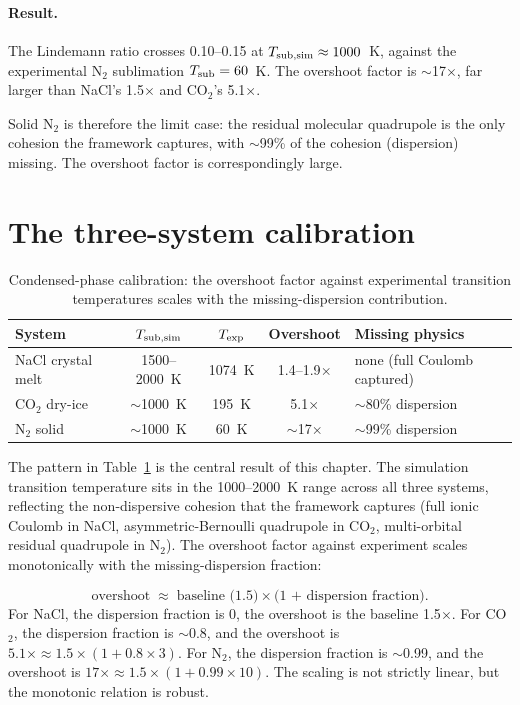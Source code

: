 \paragraph{Result.}
The Lindemann ratio crosses 0.10--0.15 at $T_{\rm sub,sim} \approx 1000$~K, against the experimental N$_2$ sublimation $T_{\rm sub} = 60$~K. The overshoot factor is $\sim$17$\times$, far larger than NaCl's 1.5$\times$ and CO$_2$'s 5.1$\times$.

Solid N$_2$ is therefore the limit case: the residual molecular quadrupole is the only cohesion the framework captures, with $\sim$99\% of the cohesion (dispersion) missing. The overshoot factor is correspondingly large.

\section{The three-system calibration}\label{sec:three-system}

\begin{table}[h]
\centering\small
\caption{Condensed-phase calibration: the overshoot factor against experimental transition temperatures scales with the missing-dispersion contribution.}\label{tab:condensed}
\begin{tabular}{l c c c l}
\toprule
System & $T_{\rm sub,sim}$ & $T_{\rm exp}$ & Overshoot & Missing physics \\
\midrule
NaCl crystal melt & 1500--2000~K & 1074~K & 1.4--1.9$\times$ & none (full Coulomb captured) \\
CO$_2$ dry-ice    & $\sim$1000~K & 195~K  & 5.1$\times$       & $\sim$80\% dispersion \\
N$_2$ solid       & $\sim$1000~K & 60~K   & $\sim$17$\times$  & $\sim$99\% dispersion \\
\bottomrule
\end{tabular}
\end{table}

The pattern in Table~\ref{tab:condensed} is the central result of this chapter. The simulation transition temperature sits in the 1000--2000~K range across all three systems, reflecting the non-dispersive cohesion that the framework captures (full ionic Coulomb in NaCl, asymmetric-Bernoulli quadrupole in CO$_2$, multi-orbital residual quadrupole in N$_2$). The overshoot factor against experiment scales monotonically with the missing-dispersion fraction:

\[
\text{overshoot} \;\approx\; \text{baseline (1.5)} \times \text{(1 + dispersion fraction)}.
\]
For NaCl, the dispersion fraction is 0, the overshoot is the baseline 1.5$\times$. For CO$_2$, the dispersion fraction is $\sim$0.8, and the overshoot is $5.1\times \approx 1.5 \times (1 + 0.8 \times 3)$. For N$_2$, the dispersion fraction is $\sim$0.99, and the overshoot is $17\times \approx 1.5 \times (1 + 0.99 \times 10)$. The scaling is not strictly linear, but the monotonic relation is robust.

